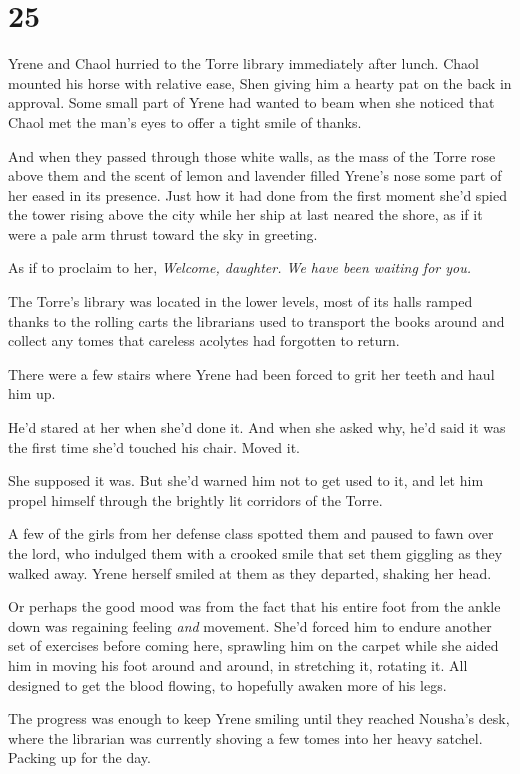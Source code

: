 
\chapter{25}

Yrene and Chaol hurried to the Torre library immediately after lunch.
Chaol mounted his horse with relative ease, Shen giving him a hearty pat on the back in approval.
Some small part of Yrene had wanted to beam when she noticed that Chaol met the man's eyes to offer a tight smile of thanks.

And when they passed through those white walls, as the mass of the Torre rose above them and the scent of lemon and lavender filled Yrene's nose  some part of her eased in its presence.
Just how it had done from the first moment she'd spied the tower rising above the city while her ship at last neared the shore, as if it were a pale arm thrust toward the sky in greeting.

As if to proclaim to her, \emph{Welcome, daughter.
We have been waiting for you.}

The Torre's library was located in the lower levels, most of its halls ramped thanks to the rolling carts the librarians used to transport the books around and collect any tomes that careless acolytes had forgotten to return.

There were a few stairs where Yrene had been forced to grit her teeth and haul him up.

He'd stared at her when she'd done it.
And when she asked why, he'd said it was the first time she'd touched his chair.
Moved it.

She supposed it was.
But she'd warned him not to get used to it, and let him propel himself through the brightly lit corridors of the Torre.

A few of the girls from her defense class spotted them and paused to fawn over the lord, who indulged them with a crooked smile that set them giggling as they walked away.
Yrene herself smiled at them as they departed, shaking her head.

Or perhaps the good mood was from the fact that his entire foot from the ankle down was regaining feeling \emph{and} movement.
She'd forced him to endure another set of exercises before coming here, sprawling him on the carpet while she aided him in moving his foot around and around, in stretching it, rotating it.
All designed to get the blood flowing, to hopefully awaken more of his legs.

The progress was enough to keep Yrene smiling until they reached Nousha's desk, where the librarian was currently shoving a few tomes into her heavy satchel.
Packing up for the day.

